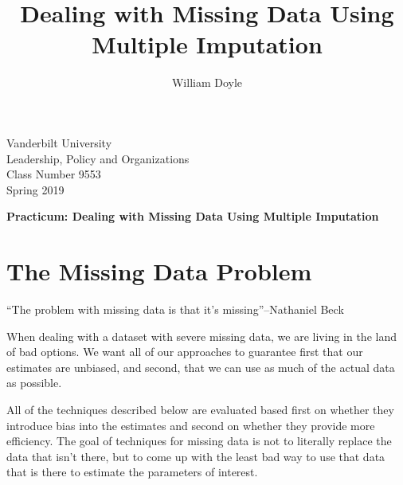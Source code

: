 \documentclass[12 pt]{article}
\title{Dealing with Missing Data Using Multiple Imputation}
\author{William Doyle}
\begin{document}
\thispagestyle{empty}%

\setlength{\parskip}{1ex plus 0.5ex minus 0.2ex}

\setcounter{secnumdepth}{-2}


\begin{flushleft}
  Vanderbilt University\\Leadership, Policy and Organizations\\Class Number 9553\\ Spring 2019\\
\end{flushleft}

\begin{center}
\textbf{Practicum: Dealing with Missing Data Using Multiple Imputation}
\end{center}

\section{The Missing Data Problem}
\label{sec:misss-data-probl}

``The problem with missing data is that it's missing''--Nathaniel Beck

When dealing with a dataset with severe missing data, we are living in
the land of bad options. We want all of our approaches to guarantee
first that our estimates are unbiased, and second, that we can use as
much of the actual data as possible. 

All of the techniques described below are evaluated based first on
whether they introduce bias into the estimates and second on whether
they provide more efficiency.  The goal of techniques for missing data
is not to literally replace the data that isn't there, but to come up
with the least bad way to use that data that is there to estimate the
parameters of interest.
\end{document}

